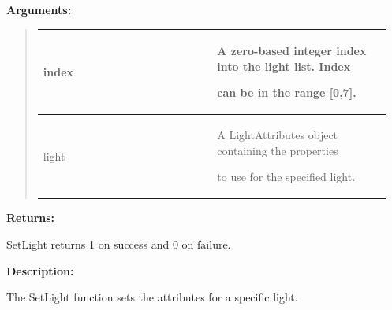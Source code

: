 \documentclass[letterpaper,10pt,english]{sphinxmanual}
\begin{document}
\begin{DUlineblock}{0em}
\item[] 
\item[] \textbf{Arguments:}
\end{DUlineblock}
\begin{quote}

\begin{tabular}{|p{0.475\linewidth}|p{0.475\linewidth}|}
\hline

index
 & 
\begin{DUlineblock}{0em}
\item[] A zero-based integer index into the light list. Index
\item[] can be in the range {[}0,7{]}.
\end{DUlineblock}
\\
\hline
light
 & 
\begin{DUlineblock}{0em}
\item[] A LightAttributes object containing the properties
\item[] to use for the specified light.
\end{DUlineblock}
\\
\hline\end{tabular}

\end{quote}

\begin{DUlineblock}{0em}
\item[] 
\item[] \textbf{Returns:}
\item[] SetLight returns 1 on success and 0 on failure.
\item[] 
\item[] \textbf{Description:}
\item[] The SetLight function sets the attributes for a specific light.
\end{DUlineblock}

\begin{DUlineblock}{0em}
\item[] 
\end{DUlineblock}
\end{document}
